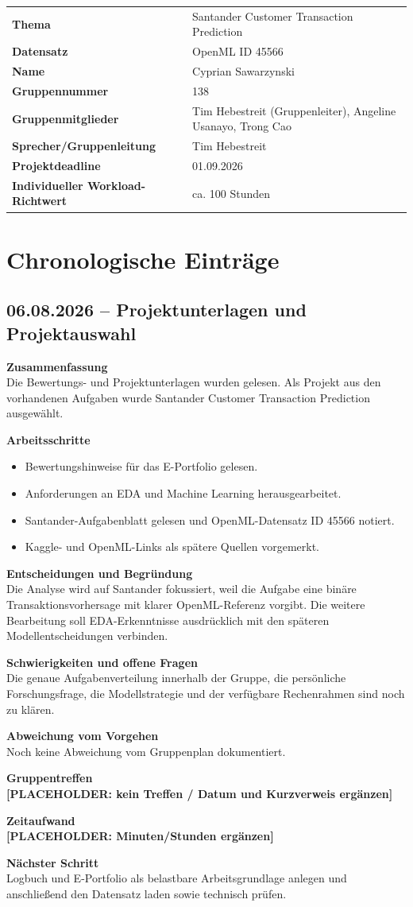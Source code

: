 \documentclass[11pt,a4paper]{article}
\newcommand{\placeholder}[1]{\textcolor{ADAgold}{\textbf{[PLACEHOLDER: #1]}}}
\newcommand{\logsection}[2]{\subsection*{#1 -- #2}}
\newcommand{\field}[2]{\noindent\textbf{#1}\\#2\par\medskip}
\providecommand{\placeholder}[1]{\textcolor{ADAgold}{\textbf{[PLACEHOLDER: #1]}}}
\providecommand{\logsection}[2]{\subsection*{#1 -- #2}}
\providecommand{\field}[2]{\noindent\textbf{#1}\\#2\par\medskip}
\begin{document}
\begin{tabularx}{\textwidth}{>{\bfseries}p{}X}
  Thema & Santander Customer Transaction Prediction \\
  Datensatz & OpenML ID 45566 \\
  Name & Cyprian Sawarzynski \\
  Gruppennummer & 138 \\
  Gruppenmitglieder & Tim Hebestreit (Gruppenleiter), Angeline Usanayo, Trong Cao \\
  Sprecher/Gruppenleitung & Tim Hebestreit \\
  Projektdeadline & 01.09.2026 \\
  Individueller Workload-Richtwert & ca. 100 Stunden \\
\end{tabularx}

\section{Chronologische Einträge}

\logsection{06.08.2026}{Projektunterlagen und Projektauswahl}
\field{Zusammenfassung}{Die Bewertungs- und Projektunterlagen wurden gelesen. Als Projekt aus
den vorhandenen Aufgaben wurde Santander Customer Transaction Prediction ausgewählt.}
\field{Arbeitsschritte}{
\begin{itemize}
  \item Bewertungshinweise für das E-Portfolio gelesen.
  \item Anforderungen an EDA und Machine Learning herausgearbeitet.
  \item Santander-Aufgabenblatt gelesen und OpenML-Datensatz ID 45566 notiert.
  \item Kaggle- und OpenML-Links als spätere Quellen vorgemerkt.
\end{itemize}}
\field{Entscheidungen und Begründung}{Die Analyse wird auf Santander fokussiert, weil die Aufgabe eine
binäre Transaktionsvorhersage mit klarer OpenML-Referenz vorgibt. Die weitere Bearbeitung soll
EDA-Erkenntnisse ausdrücklich mit den späteren Modellentscheidungen verbinden.}
\field{Schwierigkeiten und offene Fragen}{Die genaue Aufgabenverteilung innerhalb der Gruppe,
die persönliche Forschungsfrage, die Modellstrategie und der verfügbare Rechenrahmen sind noch
zu klären.}
\field{Abweichung vom Vorgehen}{Noch keine Abweichung vom Gruppenplan dokumentiert.}
\field{Gruppentreffen}{\placeholder{kein Treffen / Datum und Kurzverweis ergänzen}}
\field{Zeitaufwand}{\placeholder{Minuten/Stunden ergänzen}}
\field{Nächster Schritt}{Logbuch und E-Portfolio als belastbare Arbeitsgrundlage anlegen und anschließend
den Datensatz laden sowie technisch prüfen.}
\end{document}
